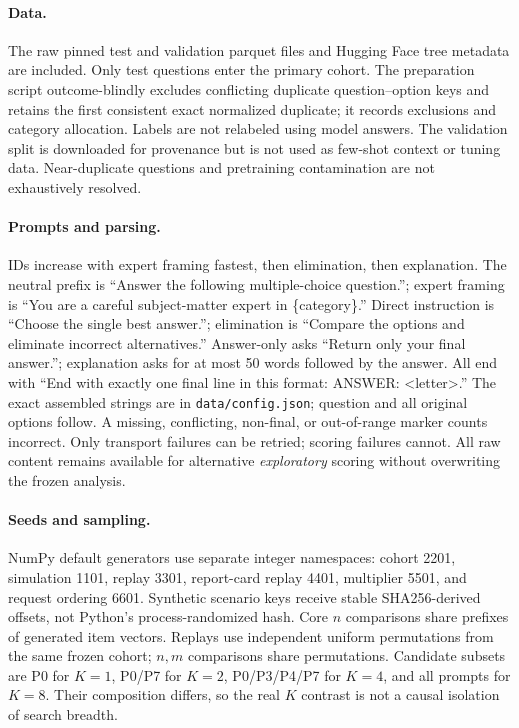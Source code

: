 \documentclass{article}
\begin{document}
\paragraph{Data.}
The raw pinned test and validation parquet files and Hugging Face tree metadata are included. Only test questions enter the primary cohort. The preparation script outcome-blindly excludes conflicting duplicate question--option keys and retains the first consistent exact normalized duplicate; it records exclusions and category allocation. Labels are not relabeled using model answers. The validation split is downloaded for provenance but is not used as few-shot context or tuning data. Near-duplicate questions and pretraining contamination are not exhaustively resolved.

\paragraph{Prompts and parsing.}
IDs increase with expert framing fastest, then elimination, then explanation. The neutral prefix is ``Answer the following multiple-choice question.''; expert framing is ``You are a careful subject-matter expert in \{category\}.'' Direct instruction is ``Choose the single best answer.''; elimination is ``Compare the options and eliminate incorrect alternatives.'' Answer-only asks ``Return only your final answer.''; explanation asks for at most 50 words followed by the answer. All end with ``End with exactly one final line in this format: ANSWER: <letter>.'' The exact assembled strings are in \texttt{data/config.json}; question and all original options follow. A missing, conflicting, non-final, or out-of-range marker counts incorrect. Only transport failures can be retried; scoring failures cannot. All raw content remains available for alternative \emph{exploratory} scoring without overwriting the frozen analysis.

\begin{table}[h]
\caption{Complete real prompt cache; fixed scoring includes all parse failures.}\label{tab:prompts}
\centering\small
\end{table}

\paragraph{Seeds and sampling.}
NumPy default generators use separate integer namespaces: cohort 2201, simulation 1101, replay 3301, report-card replay 4401, multiplier 5501, and request ordering 6601. Synthetic scenario keys receive stable SHA256-derived offsets, not Python's process-randomized hash. Core $n$ comparisons share prefixes of generated item vectors. Replays use independent uniform permutations from the same frozen cohort; $n,m$ comparisons share permutations. Candidate subsets are P0 for $K=1$, P0/P7 for $K=2$, P0/P3/P4/P7 for $K=4$, and all prompts for $K=8$. Their composition differs, so the real $K$ contrast is not a causal isolation of search breadth.
\end{document}
